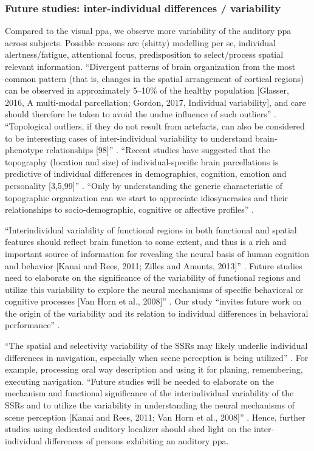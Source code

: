 \subsubsection{Future studies: inter-individual differences / variability}
%
Compared to the visual \ac{ppa}, we observe more variability of the auditory
\ac{ppa} across subjects.
%
Possible reasons are (shitty) modelling per se, individual alertness/fatigue,
attentional focus, predisposition to select/process spatial relevant
information.
%
``Divergent patterns of brain organization from the most common pattern (that
is, changes in the spatial arrangement of cortical regions) can be observed in
approximately 5–10\% of the healthy population [Glasser, 2016, A multi-modal
parcellation; Gordon, 2017, Individual variability], and care should
therefore be taken to avoid the undue influence of such outliers''
\citep{eickhoff2018imaging}.
%
``Topological outliers, if they do not result from artefacts, can also be
considered to be interesting cases of inter-individual variability to understand
brain-phenotype relationships [98]'' \citep{eickhoff2018imaging}.
%
``Recent studies have suggested that the topography (location and size)
of individual-specific brain parcellations is predictive of individual
differences in demographics, cognition, emotion and personality [3,5,99]''
\citep{eickhoff2018imaging}.
%
``Only by understanding the generic characteristic of topographic organization
can we start to appreciate idiosyncrasies and their relationships to
socio-demographic, cognitive or affective profiles''
\citep{eickhoff2018imaging}.

%
``Interindividual variability of functional regions in both functional and
spatial features should reflect brain function to some extent, and thus is a
rich and important source of information for revealing the neural basis of human
cognition and behavior [Kanai and Rees, 2011; Zilles and Amunts, 2013]''
\citep{zhen2015quantifying}.
%
Future studies need to elaborate on the significance of the variability of
functional regions and utilize this variability to explore the neural mechanisms
of specific behavioral or cognitive processes [Van Horn et al., 2008]''
\citep{zhen2015quantifying}.
%
Our study ``invites future work on the origin of the variability and its
relation to individual differences in behavioral performance''
\citep{zhen2015quantifying}.

``The spatial and selectivity variability of the SSRs may likely underlie
individual differences in navigation, especially when scene perception is being
utilized'' \citep{zhen2017quantifying}.
%
For example, processing oral way description and using it for planing,
remembering, executing navigation.
%
``Future studies will be needed to elaborate on the mechanism and functional
significance of the interindividual variability of the SSRs and to utilize the
variability in understanding the neural mechanisms of scene perception [Kanai
and Rees, 2011; Van Horn et al., 2008]'' \citep{zhen2017quantifying}.
%
Hence, further studies using dedicated auditory localizer should shed light on
the inter-individual differences of persons exhibiting an auditory \ac{ppa}.





